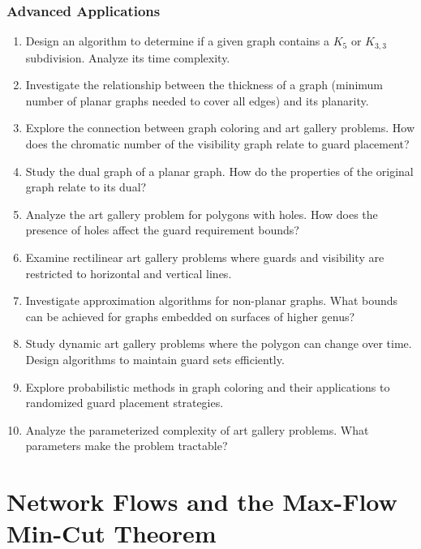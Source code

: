 \documentclass{article}
\theoremstyle{definition}
\begin{document}
\subsubsection{Advanced Applications}
\begin{enumerate}[start=51]
\item Design an algorithm to determine if a given graph contains a $K_5$ or $K_{3,3}$ subdivision. Analyze its time complexity.

\item Investigate the relationship between the thickness of a graph (minimum number of planar graphs needed to cover all edges) and its planarity.

\item Explore the connection between graph coloring and art gallery problems. How does the chromatic number of the visibility graph relate to guard placement?

\item Study the dual graph of a planar graph. How do the properties of the original graph relate to its dual?

\item Analyze the art gallery problem for polygons with holes. How does the presence of holes affect the guard requirement bounds?

\item Examine rectilinear art gallery problems where guards and visibility are restricted to horizontal and vertical lines.

\item Investigate approximation algorithms for non-planar graphs. What bounds can be achieved for graphs embedded on surfaces of higher genus?

\item Study dynamic art gallery problems where the polygon can change over time. Design algorithms to maintain guard sets efficiently.

\item Explore probabilistic methods in graph coloring and their applications to randomized guard placement strategies.

\item Analyze the parameterized complexity of art gallery problems. What parameters make the problem tractable?
\end{enumerate}

\clearpage
\section{Network Flows and the Max-Flow Min-Cut Theorem}
\end{document}
